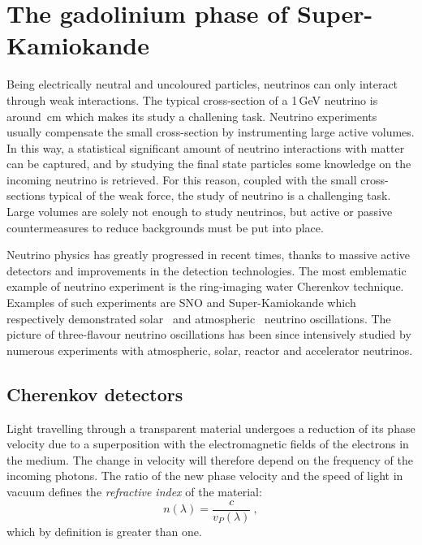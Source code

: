 \chapter{The gadolinium phase of Super-Kamiokande}
\label{sec:skgd}

Being electrically neutral and uncoloured particles, neutrinos can only interact through weak interactions.
The typical cross-section of a 1\,GeV neutrino is around \,cm %
which makes its study a challening task.
Neutrino experiments usually compensate the small cross-section by instrumenting large active volumes.
In this way, a statistical significant amount of neutrino interactions with matter can be captured, %
and by studying the final state particles some knowledge on the incoming neutrino is retrieved.
For this reason, coupled with the small cross-sections typical of the weak force, %
the study of neutrino is a challenging task.
Large volumes are solely not enough to study neutrinos, but active or passive countermeasures
to reduce backgrounds must be put into place.

Neutrino physics has greatly progressed in recent times, thanks to massive active detectors and %
improvements in the detection technologies.
The most emblematic example of neutrino experiment is the ring-imaging water Cherenkov technique.
Examples of such experiments are SNO and Super-Kamiokande
which respectively demonstrated solar~\cite{Aharmim:2005gt} and atmospheric~\cite{Fukuda:1998mi} neutrino oscillations.
The picture of three-flavour neutrino oscillations has been since intensively studied %
by numerous experiments with atmospheric, solar, reactor and accelerator neutrinos.

\section{Cherenkov detectors}
\label{sec:wch}


Light travelling through a transparent material undergoes a reduction of its phase velocity %
due to a superposition with the electromagnetic fields of the electrons in the medium. %
The change in velocity will therefore depend on the frequency of the incoming photons.
The ratio of the new phase velocity and the speed of light in vacuum defines the \emph{refractive index} %
of the material:
\begin{equation}
	\label{eq:ref_index}
	n(\lambda) = \frac{c}{v_P(\lambda)}\ ,
\end{equation}
which by definition is greater than one.

